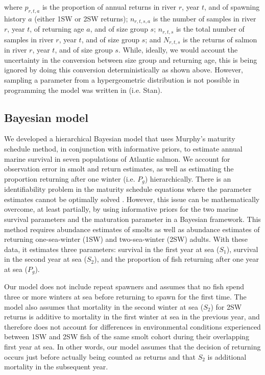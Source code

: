 \documentclass[12pt]{article}
\newcommand{\So}{$S_{1}$\xspace}
\newcommand{\St}{$S_{2}$\xspace}
\newcommand{\Pg}{$P_g$\xspace}
\begin{document}
where $p_{r,t,a}$ is the proportion of annual returns in river $r$, year $t$,
and of spawning history $a$ (either 1SW or 2SW returns); $n_{r,t,s,a}$ is the
number of samples in river $r$, year $t$, of returning age $a$, and of size
group $s$; $n_{r,t,s}$ is the total number of samples in river $r$, year $t$,
and of size group $s$; and $N_{r,t,s}$ is the returns of salmon
in river $r$, year $t$, and of size group $s$.
While, ideally, we would account the uncertainty in the conversion between
size group and returning age, this is being ignored by doing this conversion
deterministically as shown above. However, sampling a parameter from a
hypergeometric distribution is not possible in programming the model was
written in (i.e. Stan).

\subsection*{Bayesian model}

We developed a hierarchical Bayesian model that uses Murphy's maturity
schedule method, in conjunction with informative priors, to estimate annual
marine survival in seven populations of Atlantic salmon. We account for
observation error in smolt and return estimates, as well as estimating the
proportion returning after one winter (i.e. \Pg) hierarchically.
There is an identifiability problem in the maturity schedule equations where
the parameter estimates cannot be optimally solved \citep{Chaput2003a}.
However, this issue can be mathematically overcome, at least partially, by
using informative priors for the two marine survival parameters and the maturation
parameter in a Bayesian framework.
This method requires abundance estimates of smolts as well as abundance estimates
of returning one-sea-winter (1SW) and two-sea-winter (2SW) adults. With these data,
it estimates three parameters: survival in the first year at sea (\So), survival
in the second year at sea (\St), and the proportion of fish returning after one
year at sea (\Pg). 

Our model does not include repeat spawners and assumes that no fish spend
three or more winters at sea before returning to spawn for the first time.
The model also assumes that mortality in the second winter at sea (\St) for 2SW returns
is additive to mortality in the first winter at sea in the previous year, 
and therefore does not account for differences in environmental conditions experienced
between 1SW and 2SW fish of the same smolt cohort during their overlapping first year at sea.
In other words, our model assumes that the decision of returning occurs just before
actually being counted as returns and that \St is additional mortality in
the subsequent year. 
\end{document}
